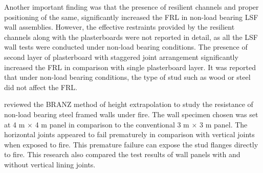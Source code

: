 Another important finding was that the presence of resilient channels and proper positioning of the same, significantly increased the FRL in non-load bearing LSF wall assemblies. However, the effective restraints provided by the resilient channels along with the plasterboards were not reported in detail, as all the LSF wall tests were conducted under non-load bearing conditions. The presence of second layer of plasterboard with staggered joint arrangement significantly increased the FRL in comparison with single plasterboard layer. It was reported that under non-load bearing conditions, the type of stud such as wood or steel did not affect the FRL.  

\citet{Collier2002} reviewed the BRANZ method of height extrapolation to study the resistance of non-load bearing steel framed walls under fire. The wall specimen chosen was set at 4 m $\times$ 4 m panel in comparison to the conventional 3 m $\times$ 3 m panel. The horizontal joints appeared to fail prematurely in comparison with vertical joints when exposed to fire. This premature failure can expose the stud flanges directly to fire. This research also compared the test results of wall panels with and without vertical lining joints.

